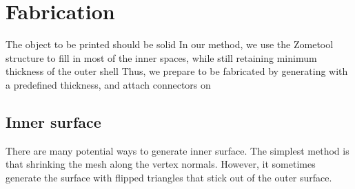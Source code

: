 \section{Fabrication}
\label{sec:fab}
The object to be printed should be solid 
In our method, we use the Zometool structure to fill in most of the inner spaces, while still retaining  minimum thickness of the outer shell  
Thus, we prepare  to be fabricated by generating  with a predefined thickness, and attach connectors on 
    
\subsection{Inner surface}
There are many potential ways to generate  inner surface. 
The simplest method is that shrinking the mesh along the vertex normals.
However, it sometimes generate the surface with flipped triangles that stick out of the outer surface.

